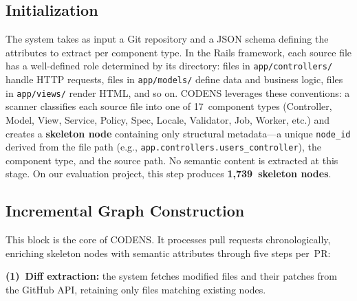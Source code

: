 \documentclass[sigconf]{acmart}
\begin{document}
\subsection{Initialization}

The system takes as input a Git repository and a JSON schema defining the attributes to extract per component type. In the Rails framework, each source file has a well-defined role determined by its directory: files in \texttt{app/controllers/} handle HTTP requests, files in \texttt{app/models/} define data and business logic, files in \texttt{app/views/} render HTML, and so on. CODENS leverages these conventions: a scanner classifies each source file into one of 17~component types (Controller, Model, View, Service, Policy, Spec, Locale, Validator, Job, Worker, etc.) and creates a \textbf{skeleton node} containing only structural metadata---a unique \texttt{node\_id} derived from the file path (e.g., \texttt{app.controllers.users\_controller}), the component type, and the source path. No semantic content is extracted at this stage. On our evaluation project, this step produces \textbf{1,739~skeleton nodes}.

\subsection{Incremental Graph Construction}

This block is the core of CODENS. It processes pull requests chronologically, enriching skeleton nodes with semantic attributes through five steps per~PR:

\textbf{(1)~Diff extraction:} the system fetches modified files and their patches from the GitHub API, retaining only files matching existing nodes.

\end{document}
